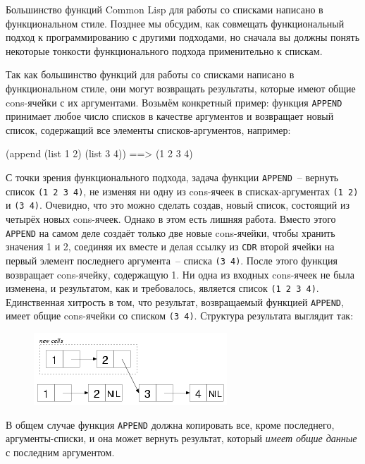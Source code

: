 Большинство функций Common Lisp для работы со списками написано в функциональном
стиле. Позднее мы обсудим, как совмещать функциональный подход к программированию с другими
подходами, но сначала вы должны понять некоторые тонкости функционального подхода
применительно к спискам.

Так как большинство функций для работы со списками написано в функциональном стиле, они могут
возвращать результаты, которые имеют общие cons-ячейки с их аргументами. Возьмём
конкретный пример: функция \lstinline{APPEND} принимает любое число списков в качестве
аргументов и возвращает новый список, содержащий все элементы списков-аргументов,
например:

\begin{myverb}
(append (list 1 2) (list 3 4)) ==> (1 2 3 4)
\end{myverb}

С точки зрения функционального подхода, задача функции \lstinline{APPEND}~-- вернуть список
\lstinline{(1 2 3 4)}, не изменяя ни одну из cons-ячеек в списках-аргументах \lstinline{(1 2)} и
\lstinline{(3 4)}. Очевидно, что это можно сделать создав, новый список, состоящий из четырёх
новых cons-ячеек. Однако в этом есть лишняя работа. Вместо этого \lstinline{APPEND} на самом
деле создаёт только две новые cons-ячейки, чтобы хранить значения 1 и 2, соединяя их
вместе и делая ссылку из \lstinline{CDR} второй ячейки на первый элемент последнего аргумента~--
списка \lstinline{(3 4)}. После этого функция возвращает cons-ячейку, содержащую 1. Ни одна из
входных cons-ячеек не была изменена, и результатом, как и требовалось, является список
\lstinline{(1 2 3 4)}. Единственная хитрость в том, что результат, возвращаемый функцией
\lstinline{APPEND}, имеет общие cons-ячейки со списком \lstinline{(3 4)}. Структура результата
выглядит так:

\begin{figure}[h]
  \centering
  \includegraphics[scale=0.6]{images/after-append.png}
\end{figure}

В общем случае функция \lstinline{APPEND} должна копировать все, кроме последнего,
аргументы-списки, и она может вернуть результат, который \textit{имеет общие данные} с
последним аргументом.


